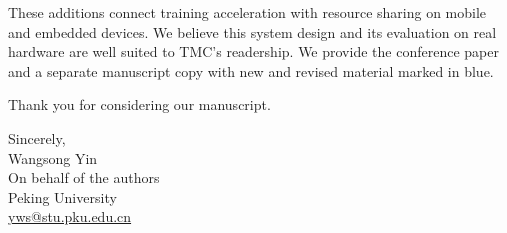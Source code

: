 \documentclass[11pt,letterpaper]{article}
\begin{document}
These additions connect training acceleration with resource sharing on mobile and embedded devices. We believe this system design and its evaluation on real hardware are well suited to TMC's readership. We provide the conference paper and a separate manuscript copy with new and revised material marked in blue.

Thank you for considering our manuscript.

Sincerely,\\
Wangsong Yin\\
On behalf of the authors\\
Peking University\\
\href{mailto:yws@stu.pku.edu.cn}{yws@stu.pku.edu.cn}
\end{document}
